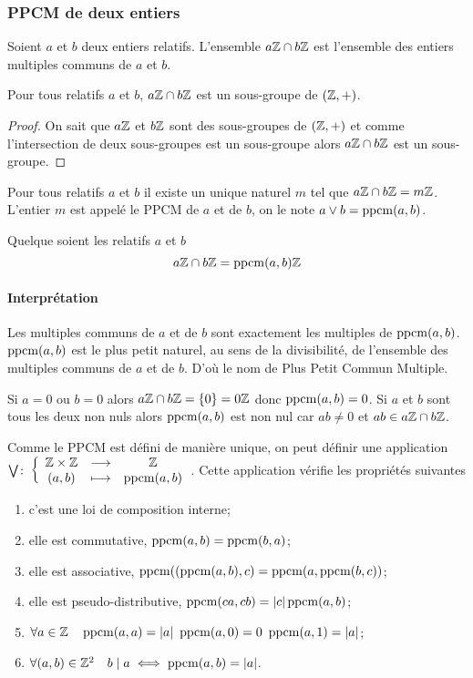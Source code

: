 \subsubsection{PPCM de deux entiers}

Soient $a$ et $b$ deux entiers relatifs. L'ensemble $a\mathbb{Z} \cap b\mathbb{Z}$ est l'ensemble des entiers multiples communs de $a$ et $b$.
\begin{theo}
  Pour tous relatifs $a$ et $b$, $a\mathbb{Z} \cap b\mathbb{Z}$ est un sous-groupe de $(\mathbb{Z},+)$.
\end{theo}
\begin{proof}
  On sait que $a\mathbb{Z}$ et $b\mathbb{Z}$ sont des sous-groupes de $(\mathbb{Z},+)$ et comme l'intersection de deux sous-groupes est un sous-groupe alors $a\mathbb{Z} \cap b\mathbb{Z}$ est un sous-groupe.
\end{proof}
\begin{corth}
  Pour tous relatifs $a$ et $b$ il existe un unique naturel $m$ tel que $a\mathbb{Z} \cap b\mathbb{Z}= m \mathbb{Z}$. L'entier $m$ est appelé le PPCM de $a$ et de $b$, on le note $a \vee b = \operatorname{ppcm}(a,b)$.
\end{corth}
\begin{theo}
  Quelque soient les relatifs $a$ et $b$
  \begin{equation}
    a\mathbb{Z} \cap b\mathbb{Z} = \operatorname{ppcm}(a,b) \mathbb{Z}
  \end{equation}
\end{theo}

\paragraph{Interprétation}

Les multiples communs de $a$ et de $b$ sont exactement les multiples de $\operatorname{ppcm}(a,b)$. $\operatorname{ppcm}(a,b)$ est le plus petit naturel, au sens de la divisibilité, de l'ensemble des multiples communs de $a$ et de $b$. D'où le nom de Plus Petit Commun Multiple.

Si $a=0$ ou $b=0$ alors $a\mathbb{Z} \cap b\mathbb{Z} = \{0\}=0\mathbb{Z}$ donc $\operatorname{ppcm}(a,b)=0$. Si $a$ et $b$ sont tous les deux non nuls alors $\operatorname{ppcm}(a,b)$ est non nul car $ab \neq 0$ et $ab \in a\mathbb{Z} \cap b\mathbb{Z}$.

\begin{prop}
  Comme le PPCM est défini de manière unique, on peut définir une application $\bigvee\colon \left\{\begin{array}{ccc} \mathbb{Z}\times\mathbb{Z} & \longrightarrow &\mathbb{Z}\\ (a,b) & \longmapsto & \operatorname{ppcm}(a,b) \end{array} \right.$. Cette application vérifie les propriétés suivantes
  \begin{enumerate}
  \item c'est une loi de composition interne;
  \item elle est commutative, $\operatorname{ppcm}(a,b)=\operatorname{ppcm}(b,a)$;
  \item elle est associative, $\operatorname{ppcm}((\operatorname{ppcm}(a,b),c)=\operatorname{ppcm}(a,\operatorname{ppcm}(b,c))$;
  \item elle est pseudo-distributive, $\operatorname{ppcm}(ca,cb)=\left\lvert c\right\rvert\operatorname{ppcm}(a,b)$;
  \item $\forall a \in \Z \quad \ppcm(a,a)=\abs{a} \ \ppcm(a,0) = 0 \ \ppcm(a,1)=\abs{a}$;
  \item $\forall (a,b) \in \mathbb{Z}^2 \quad b\mid a \iff \operatorname{ppcm}(a,b)=\left\lvert a\right\rvert$.
  \end{enumerate}
\end{prop}

